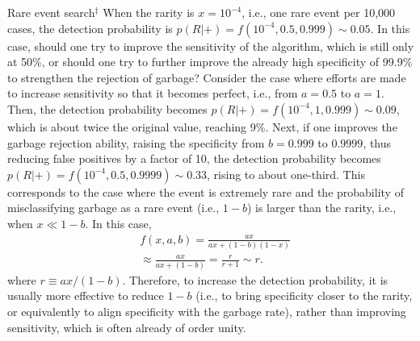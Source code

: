 \begin{itembox}{Rare event search$^\ddagger$}
When the rarity is $x = 10^{-4}$, i.e., one rare event per 10,000 cases, the detection probability is $p(R|+) = f(10^{-4}, 0.5, 0.999) \sim 0.05$. In this case, should one try to improve the sensitivity of the algorithm, which is still only at 50\%, or should one try to further improve the already high specificity of 99.9\% to strengthen the rejection of garbage?
Consider the case where efforts are made to increase sensitivity so that it becomes perfect, i.e., from $a=0.5$ to $a=1$. Then, the detection probability becomes $p(R|+) = f(10^{-4}, 1, 0.999) \sim 0.09$, which is about twice the original value, reaching 9\%. Next, if one improves the garbage rejection ability, raising the specificity from $b=0.999$ to $0.9999$, thus reducing false positives by a factor of 10, the detection probability becomes $p(R|+) = f(10^{-4}, 0.5, 0.9999) \sim 0.33$, rising to about one-third. This corresponds to the case where the event is extremely rare and the probability of misclassifying garbage as a rare event (i.e., $1-b$) is larger than the rarity, i.e., when $x \ll 1 - b$. In this case,
\begin{align}
    &f(x,a,b) = \frac{a x }{a x + ( 1 - b ) (1 - x)} \nonumber \\
    &\approx \frac{a x }{a x + ( 1 - b )} = \frac{r}{ r + 1 } \sim r. 
\end{align}
where $r \equiv a x/(1 - b)$. Therefore, to increase the detection probability, it is usually more effective to reduce $1-b$ (i.e., to bring specificity closer to the rarity, or equivalently to align specificity with the garbage rate), rather than improving sensitivity, which is often already of order unity.
\end{itembox}


